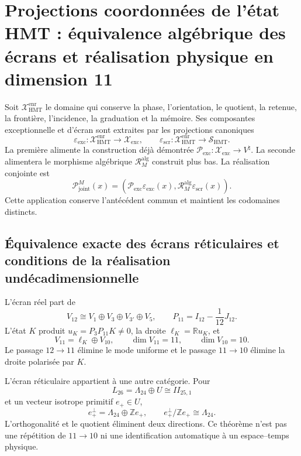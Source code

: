 \section{Projections coordonnées de l'état HMT : équivalence algébrique des écrans et réalisation physique en dimension 11}
\label{sec:cierre-equivalencias-moonshine-teoria-m-20260825}

Soit \(\mathcal X_{\mathrm{HMT}}^{\mathrm{enr}}\) le domaine qui conserve
la phase, l'orientation, le quotient, la retenue, la frontière, l'incidence, la graduation et la
mémoire. Ses composantes exceptionnelle et d'écran sont extraites par les
projections canoniques
\[
 \varepsilon_{\mathrm{exc}}:
 \mathcal X_{\mathrm{HMT}}^{\mathrm{enr}}
 \longrightarrow\mathscr X_{\mathrm{exc}},
 \qquad
 \varepsilon_{\mathrm{scr}}:
 \mathcal X_{\mathrm{HMT}}^{\mathrm{enr}}
 \longrightarrow\mathscr S_{\mathrm{HMT}}.
\]
La première alimente la construction déjà démontrée
\(\mathcal P_{\mathrm{exc}}:\mathscr X_{\mathrm{exc}}\to V^\natural\).
La seconde alimentera le morphisme algébrique
\(\mathcal R_M^{\mathrm{alg}}\) construit plus bas. La réalisation conjointe
est
\[
 \mathcal P_{\mathrm{joint}}^M(x)
 =\left(
   \mathcal P_{\mathrm{exc}}\varepsilon_{\mathrm{exc}}(x),
   \mathcal R_M^{\mathrm{alg}}\varepsilon_{\mathrm{scr}}(x)
  \right).
\]
Cette application conserve l'antécédent commun et maintient les codomaines distincts.

\subsection{Équivalence exacte des écrans réticulaires et conditions de la réalisation undécadimensionnelle}

L'écran réel part de
\[
 V_{12}\cong V_1\oplus V_3\oplus V_{3'}\oplus V_5,
 \qquad
 P_{11}=I_{12}-\frac1{12}J_{12}.
\]
L'état \(K\) produit \(u_K=P_3P_{11}K\ne0\), la droite
\(\ell_K=\mathbb Ru_K\), et
\[
 V_{11}=\ell_K\oplus V_{10},
 \qquad \dim V_{11}=11,
 \qquad \dim V_{10}=10.
\]
Le passage \(12\to11\) élimine le mode uniforme et le passage \(11\to10\) élimine
la droite polarisée par \(K\).

L'écran réticulaire appartient à une autre catégorie. Pour
\[
 L_{26}=\Lambda_{24}\oplus U\cong II_{25,1}
\]
et un vecteur isotrope primitif \(e_+\in U\),
\[
 e_+^\perp=\Lambda_{24}\oplus\mathbb Ze_+,
 \qquad
 \boxed{e_+^\perp/\mathbb Ze_+\cong\Lambda_{24}.}
\]
L'orthogonalité et le quotient éliminent deux directions. Ce théorème n'est pas
une répétition de \(11\to10\) ni une identification automatique à un
espace--temps physique.

